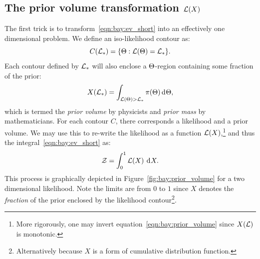 \subsection{The prior volume transformation \(\mathcal{L}(X)\)}
The first trick is to transform~\eqref{eqn:bay:ev_short} into an effectively one dimensional problem. We define an iso-likelihood contour as:
\begin{equation}
  C(\mathcal{L}_\ast) = \{\Theta : \mathcal{L}(\Theta)=\mathcal{L}_\ast \}.
  \label{eqn:bay:contour_def}
\end{equation}
Each contour defined by \(\mathcal{L}_\ast\) will also enclose a \(\Theta\)-region containing some fraction of the prior:
\begin{equation}
  X(\mathcal{L}_\ast) = \int_{\mathcal{L}(\Theta)>\mathcal{L}_\ast} \pi(\Theta) \operatorname{d}^{}\!{\Theta},
  \label{eqn:bay:prior_volume}
\end{equation}
which is termed the {\em prior volume\/} by physicists and {\em prior mass\/} by mathematicians. For each contour \(C\), there corresponds a likelihood and a prior volume. We may use this to re-write the likelihood as a function \(\mathcal{L}(X)\),\footnote{More rigorously, one may invert equation~\protect\eqref{eqn:bay:prior_volume} since \(X(\mathcal{L})\) is monotonic.} and thus the integral~\eqref{eqn:bay:ev_short} as:
\begin{equation}
  \mathcal{Z} = \int_0^1 \mathcal{L}(X)\:\operatorname{d}^{}\!{X}.
  \label{eqn:bay:ev_X}
\end{equation}
This process is graphically depicted in Figure~\ref{fig:bay:prior_volume} for a two dimensional likelihood. Note the limits are from \(0\) to \(1\) since \(X\) denotes the {\em fraction\/} of the prior enclosed by the likelihood contour\footnote{Alternatively because \(X\) is a form of cumulative distribution function.}.
%
